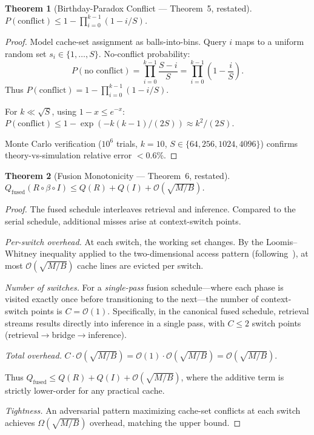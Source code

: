 \documentclass{article}
\newtheorem{theorem}{Theorem}
\theoremstyle{definition}
\theoremstyle{remark}
\newcommand{\BigO}{\mathcal{O}}
\newcommand{\Qfused}{Q_{\mathrm{fused}}}
\begin{document}
\begin{theorem}[Birthday-Paradox Conflict --- Theorem~5, restated]\label{thm:birthday-app}
$P(\text{conflict}) \leq 1 - \prod_{i=0}^{k-1}(1 - i/S)$.
\end{theorem}

\begin{proof}
Model cache-set assignment as balls-into-bins. Query $i$ maps to a uniform random set $s_i \in \{1,\ldots,S\}$. No-conflict probability:
\[
  P(\text{no conflict}) = \prod_{i=0}^{k-1}\frac{S-i}{S} = \prod_{i=0}^{k-1}\left(1 - \frac{i}{S}\right).
\]
Thus $P(\text{conflict}) = 1 - \prod_{i=0}^{k-1}(1-i/S)$.

For $k \ll \sqrt{S}$, using $1-x \leq e^{-x}$:
$P(\text{conflict}) \leq 1 - \exp(-k(k-1)/(2S)) \approx k^2/(2S)$.

Monte Carlo verification ($10^6$ trials, $k=10$, $S \in \{64,256,1024,4096\}$) confirms theory-vs-simulation relative error $< 0.6\%$.
\end{proof}

\begin{theorem}[Fusion Monotonicity --- Theorem~6, restated]\label{thm:monotonicity-app}
$\Qfused(R \circ \beta \circ I) \leq Q(R) + Q(I) + \BigO(\sqrt{M/B})$.
\end{theorem}

\begin{proof}
The fused schedule interleaves retrieval and inference. Compared to the serial schedule, additional misses arise at context-switch points.

\emph{Per-switch overhead.}
At each switch, the working set changes. By the Loomis--Whitney inequality applied to the two-dimensional access pattern (following~\cite{frigo1999cache}), at most $\BigO(\sqrt{M/B})$ cache lines are evicted per switch.

\emph{Number of switches.}
For a \emph{single-pass} fusion schedule---where each phase is visited exactly once before transitioning to the next---the number of context-switch points is $C = \BigO(1)$. Specifically, in the canonical fused schedule, retrieval streams results directly into inference in a single pass, with $C \leq 2$ switch points (retrieval$\to$bridge$\to$inference).

\emph{Total overhead.}
$C \cdot \BigO(\sqrt{M/B}) = \BigO(1) \cdot \BigO(\sqrt{M/B}) = \BigO(\sqrt{M/B})$.

Thus $\Qfused \leq Q(R) + Q(I) + \BigO(\sqrt{M/B})$, where the additive term is strictly lower-order for any practical cache.

\emph{Tightness.}
An adversarial pattern maximizing cache-set conflicts at each switch achieves $\Omega(\sqrt{M/B})$ overhead, matching the upper bound.
\end{proof}
\end{document}
